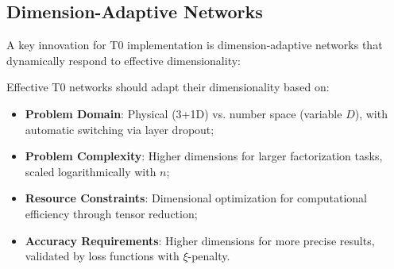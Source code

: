 	\begin{table}[htbp]
		\centering
		\caption{Neural network architectures for T0 implementation, extended with specific T0 advantages}
		\label{tab:network_architectures}
	\end{table}
	
	\subsection{Dimension-Adaptive Networks}
	\label{subsec:dimension_adaptive}
	
	A key innovation for T0 implementation is dimension-adaptive networks that dynamically respond to effective dimensionality:
	
	\begin{formula}[colback=blue!5!white,colframe=blue!75!black,title=Dimension-Adaptive Network Design]
		Effective T0 networks should adapt their dimensionality based on:
		\begin{itemize}
			\item \textbf{Problem Domain}: Physical (3+1D) vs. number space (variable $D$), with automatic switching via layer dropout;
			\item \textbf{Problem Complexity}: Higher dimensions for larger factorization tasks, scaled logarithmically with $n$;
			\item \textbf{Resource Constraints}: Dimensional optimization for computational efficiency through tensor reduction;
			\item \textbf{Accuracy Requirements}: Higher dimensions for more precise results, validated by loss functions with $\xi$-penalty.
		\end{itemize}
	\end{formula}
	
